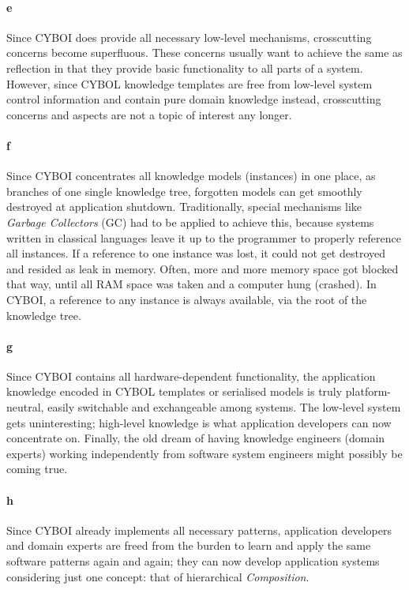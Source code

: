\paragraph{e}

Since CYBOI does provide all necessary low-level mechanisms, crosscutting
concerns become superfluous. These concerns usually want to achieve the same as
reflection in that they provide basic functionality to all parts of a system.
However, since CYBOL knowledge templates are free from low-level system control
information and contain pure domain knowledge instead, crosscutting concerns
and aspects are not a topic of interest any longer.

\paragraph{f}

Since CYBOI concentrates all knowledge models (instances) in one place, as
branches of one single knowledge tree, forgotten models can get smoothly
destroyed at application shutdown. Traditionally, special mechanisms like
\emph{Garbage Collectors} (GC) had to be applied to achieve this, because
systems written in classical languages leave it up to the programmer to
properly reference all instances. If a reference to one instance was lost, it
could not get destroyed and resided as leak in memory. Often, more and more
memory space got blocked that way, until all RAM space was taken and a computer
hung (crashed). In CYBOI, a reference to any instance is always available, via
the root of the knowledge tree.

\paragraph{g}

Since CYBOI contains all hardware-dependent functionality, the application
knowledge encoded in CYBOL templates or serialised models is truly
platform-neutral, easily switchable and exchangeable among systems. The
low-level system gets uninteresting; high-level knowledge is what application
developers can now concentrate on. Finally, the old dream of having knowledge
engineers (domain experts) working independently from software system engineers
might possibly be coming true.

\paragraph{h}

Since CYBOI already implements all necessary patterns, application developers
and domain experts are freed from the burden to learn and apply the same
software patterns again and again; they can now develop application systems
considering just one concept: that of hierarchical \emph{Composition}.
